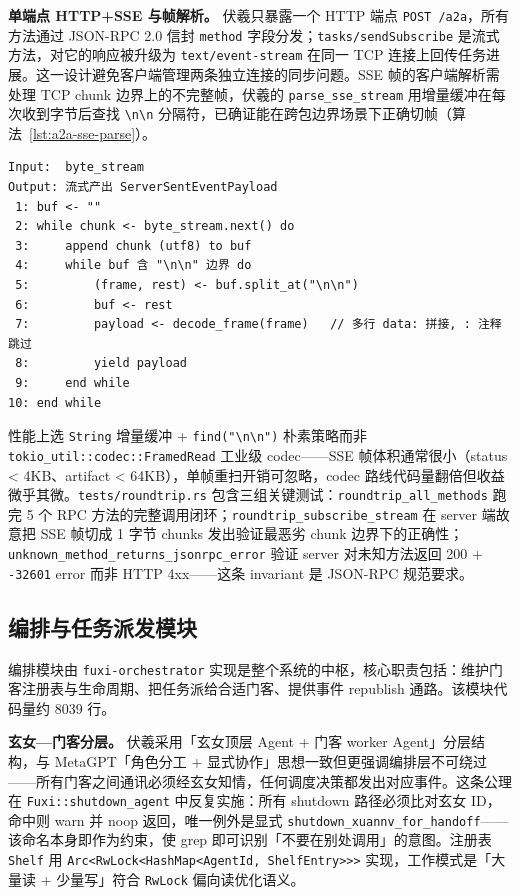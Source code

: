 \textbf{单端点 HTTP+SSE 与帧解析。} 伏羲只暴露一个 HTTP 端点 \texttt{POST /a2a}，所有方法通过 JSON-RPC 2.0 信封 \texttt{method} 字段分发；\texttt{tasks/sendSubscribe} 是流式方法，对它的响应被升级为 \texttt{text/event-stream}\parencite{whatwg2024sse} 在同一 TCP 连接上回传任务进展。这一设计避免客户端管理两条独立连接的同步问题。SSE 帧的客户端解析需处理 TCP chunk 边界上的不完整帧，伏羲的 \texttt{parse\_sse\_stream} 用增量缓冲在每次收到字节后查找 \texttt{\textbackslash n\textbackslash n} 分隔符，已确证能在跨包边界场景下正确切帧（算法~\ref{lst:a2a-sse-parse}）。

\begin{lstlisting}[language=Pseudo, caption=A2A 客户端 SSE 帧解析（fuxi-a2a/src/client.rs::parse\_sse\_stream）, label=lst:a2a-sse-parse]
Input:  byte_stream
Output: 流式产出 ServerSentEventPayload
 1: buf <- ""
 2: while chunk <- byte_stream.next() do
 3:     append chunk (utf8) to buf
 4:     while buf 含 "\n\n" 边界 do
 5:         (frame, rest) <- buf.split_at("\n\n")
 6:         buf <- rest
 7:         payload <- decode_frame(frame)   // 多行 data: 拼接, : 注释跳过
 8:         yield payload
 9:     end while
10: end while
\end{lstlisting}

性能上选 \texttt{String} 增量缓冲 + \texttt{find("\textbackslash n\textbackslash n")} 朴素策略而非 \texttt{tokio\_util::codec::FramedRead} 工业级 codec——SSE 帧体积通常很小（status < 4KB、artifact < 64KB），单帧重扫开销可忽略，codec 路线代码量翻倍但收益微乎其微。\texttt{tests/roundtrip.rs} 包含三组关键测试：\texttt{roundtrip\_all\_methods} 跑完 5 个 RPC 方法的完整调用闭环；\texttt{roundtrip\_subscribe\_stream} 在 server 端故意把 SSE 帧切成 1 字节 chunks 发出验证最恶劣 chunk 边界下的正确性；\texttt{unknown\_method\_returns\_jsonrpc\_error} 验证 server 对未知方法返回 200 + \texttt{-32601} error 而非 HTTP 4xx——这条 invariant 是 JSON-RPC 规范要求。

\subsection{编排与任务派发模块}
\label{subsec:orchestrator}

编排模块由 \texttt{fuxi-orchestrator} 实现是整个系统的中枢，核心职责包括：维护门客注册表与生命周期、把任务派给合适门客、提供事件 republish 通路。该模块代码量约 8039 行。

\textbf{玄女—门客分层。} 伏羲采用「玄女顶层 Agent + 门客 worker Agent」分层结构，与 MetaGPT\parencite{hong2023metagpt}「角色分工 + 显式协作」思想一致但更强调编排层不可绕过——所有门客之间通讯必须经玄女知情，任何调度决策都发出对应事件。这条公理在 \texttt{Fuxi::shutdown\_agent} 中反复实施：所有 shutdown 路径必须比对玄女 ID，命中则 warn 并 noop 返回，唯一例外是显式 \texttt{shutdown\_xuannv\_for\_handoff}——该命名本身即作为约束，使 grep 即可识别「不要在别处调用」的意图。注册表 \texttt{Shelf} 用 \texttt{Arc<RwLock<HashMap<AgentId, ShelfEntry>>>} 实现，工作模式是「大量读 + 少量写」符合 \texttt{RwLock} 偏向读优化语义。

